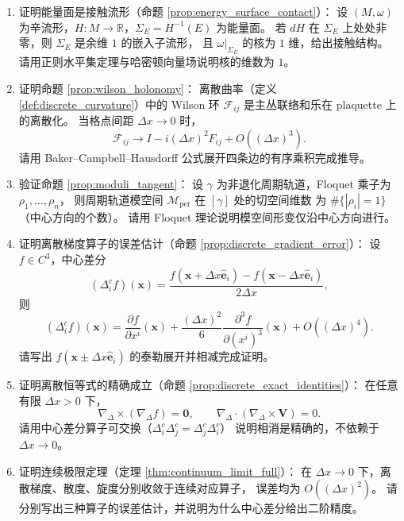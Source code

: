 \begin{enumerate}[leftmargin=3em, label=\textbf{题 \arabic*}]
    \item 证明能量面是接触流形（命题 \ref{prop:energy_surface_contact}）：
    设 $(M,\omega)$ 为辛流形，$H:M\to\mathbb{R}$，$\Sigma_E=H^{-1}(E)$ 为能量面。
    若 $dH$ 在 $\Sigma_E$ 上处处非零，则 $\Sigma_E$ 是余维 $1$ 的嵌入子流形，
    且 $\omega|_{\Sigma_E}$ 的核为 $1$ 维，给出接触结构。
    请用正则水平集定理与哈密顿向量场说明核的维数为 $1$。

    \item 证明命题 \ref{prop:wilson_holonomy}：
    离散曲率（定义 \ref{def:discrete_curvature}）中的 Wilson 环
    $\mathcal{F}_{ij}$ 是主丛联络和乐在 plaquette 上的离散化。
    当格点间距 $\Delta x\to0$ 时，
    \[
    \mathcal{F}_{ij}\to I-i(\Delta x)^2F_{ij}+O((\Delta x)^3).
    \]
    请用 Baker--Campbell--Hausdorff 公式展开四条边的有序乘积完成推导。

    \item 验证命题 \ref{prop:moduli_tangent}：
    设 $\gamma$ 为非退化周期轨道，Floquet 乘子为 $\rho_1,\dots,\rho_n$，
    则周期轨道模空间 $\mathcal{M}_{\text{per}}$ 在 $[\gamma]$ 处的切空间维数
    为 $\#\{|\rho_i|=1\}$（中心方向的个数）。
    请用 Floquet 理论说明模空间形变仅沿中心方向进行。

    \item 证明离散梯度算子的误差估计（命题 \ref{prop:discrete_gradient_error}）：
    设 $f\in C^3$，中心差分
    \[
    (\Delta_i^cf)(\mathbf{x})
    =\frac{f(\mathbf{x}+\Delta x\hat{\mathbf{e}}_i)-f(\mathbf{x}-\Delta x\hat{\mathbf{e}}_i)}{2\Delta x},
    \]
    则
    \[
    (\Delta_i^cf)(\mathbf{x})
    =\frac{\partial f}{\partial x^i}(\mathbf{x})
    +\frac{(\Delta x)^2}{6}\frac{\partial^3f}{\partial(x^i)^3}(\mathbf{x})
    +O((\Delta x)^4).
    \]
    请写出 $f(\mathbf{x}\pm\Delta x\hat{\mathbf{e}}_i)$ 的泰勒展开并相减完成证明。

    \item 证明离散恒等式的精确成立（命题 \ref{prop:discrete_exact_identities}）：
    在任意有限 $\Delta x>0$ 下，
    \[
    \nabla_{\Delta}\times(\nabla_{\Delta}f)=\mathbf{0},\qquad
    \nabla_{\Delta}\cdot(\nabla_{\Delta}\times\mathbf{V})=0.
    \]
    请用中心差分算子可交换（$\Delta_i^c\Delta_j^c=\Delta_j^c\Delta_i^c$）
    说明相消是精确的，不依赖于 $\Delta x\to0$。

    \item 证明连续极限定理（定理 \ref{thm:continuum_limit_full}）：
    在 $\Delta x\to0$ 下，离散梯度、散度、旋度分别收敛于连续对应算子，
    误差均为 $O((\Delta x)^2)$。
    请分别写出三种算子的误差估计，并说明为什么中心差分给出二阶精度。


\end{enumerate}
